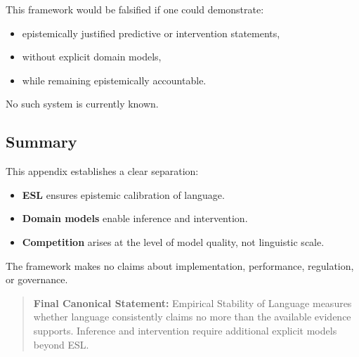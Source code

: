 This framework would be falsified if one could demonstrate:
\begin{itemize}
    \item epistemically justified predictive or intervention statements,
    \item without explicit domain models,
    \item while remaining epistemically accountable.
\end{itemize}

No such system is currently known.


\subsection{Summary}

This appendix establishes a clear separation:
\begin{itemize}
    \item \textbf{ESL} ensures epistemic calibration of language.
    \item \textbf{Domain models} enable inference and intervention.
    \item \textbf{Competition} arises at the level of model quality, not linguistic scale.
\end{itemize}

The framework makes no claims about implementation, performance, regulation, or governance.

\begin{quote}
\textbf{Final Canonical Statement:} Empirical Stability of Language measures whether language consistently claims no more than the available evidence supports. Inference and intervention require additional explicit models beyond ESL.
\end{quote}
